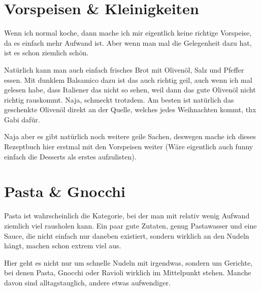 \documentclass[
a4paper,
11pt
]{article}
\begin{document}
\section{Vorspeisen \& Kleinigkeiten}

Wenn ich normal koche, dann mache ich mir eigentlich keine richtige Vorspeise, da es einfach mehr Aufwand ist. Aber wenn man mal die Gelegenheit dazu hat, ist es schon ziemlich schön.

Natürlich kann man auch einfach frisches Brot mit Olivenöl, Salz und Pfeffer essen. Mit dunklem Balsamico dazu ist das auch richtig geil, auch wenn ich mal gelesen habe, dass Italiener das nicht so sehen, weil dann das gute Olivenöl nicht richtig rauskommt. Naja, schmeckt trotzdem. Am besten ist natürlich das geschenkte Olivenöl direkt an der Quelle, welches jedes Weihnachten kommt, thx Gabi dafür.

Naja aber es gibt natürlich noch weitere geile Sachen, deswegen mache ich dieses Rezeptbuch hier erstmal mit den Vorspeisen weiter (Wäre eigentlich auch funny einfach die Desserts als erstes aufzulisten).


\mylocaltableofcontents%
\newpage










\section{Pasta \& Gnocchi}

Pasta ist wahrscheinlich die Kategorie, bei der man mit relativ wenig Aufwand ziemlich viel rausholen kann. Ein paar gute Zutaten, genug Pastawasser und eine Sauce, die nicht einfach nur daneben existiert, sondern wirklich an den Nudeln hängt, machen schon extrem viel aus.

Hier geht es nicht nur um schnelle Nudeln mit irgendwas, sondern um Gerichte, bei denen Pasta, Gnocchi oder Ravioli wirklich im Mittelpunkt stehen. Manche davon sind alltagstauglich, andere etwas aufwendiger.

\mylocaltableofcontents%
\newpage










\end{document}
